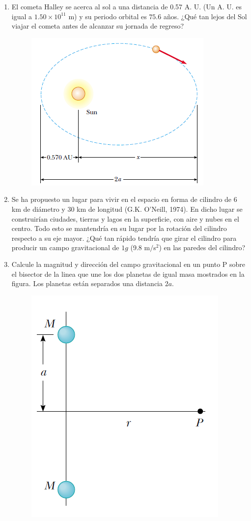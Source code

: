 \documentclass[11pt,twocolumn]{article}
\begin{document}
\begin{enumerate}
\item El cometa Halley se acerca al sol a una distancia de 0.57 A. U. (Un A. U. es igual a $1.50 \times 10^{11}$ m) y su periodo orbital es $75.6$ años. ¿Qué tan lejos del Sol viajar el cometa antes de alcanzar su jornada de regreso?
\begin{figure}[h]
\centering
\includegraphics[scale=0.55]{fig2}
\end{figure}

\item Se ha propuesto un lugar para vivir en el espacio en forma de cilindro de $6$ km de diámetro y $30$ km de longitud (G.K. O'Neill, 1974). En dicho lugar se construirían ciudades, tierras y lagos en la superficie, con aire y nubes en el centro. Todo esto se mantendría en su lugar por la rotación del cilindro respecto a su eje mayor. ¿Qué tan rápido tendría que girar el cilindro para producir un campo gravitacional de $1 g$ (9.8 m$/$s$^{2}$) en las paredes del cilindro?


\item Calcule la magnitud y dirección del campo gravitacional en un punto P sobre el bisector de la linea que une los dos planetas de igual masa mostrados en la figura. Los planetas están separados una distancia $2a$.
\begin{figure}[h]
\centering
\includegraphics[scale=0.4]{fig6}
\end{figure}


\end{enumerate}
\end{document}

